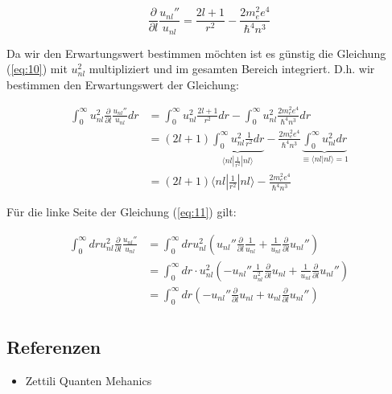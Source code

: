 \begin{equation}
  \label{eq:10}
  \frac{\partial}{\partial l}\frac{u_{nl}''}{u_{nl}} = \frac{2l+1}{r^2} - \frac{2 m_e^2e^4}{\hbar^4 n^3}
\end{equation}


Da wir den Erwartungswert bestimmen möchten ist es günstig die Gleichung (\ref{eq:10}) mit \(u_{nl}^2\) multipliziert und im gesamten Bereich integriert. D.h. wir bestimmen den Erwartungswert der Gleichung:

\begin{align}
  \label{eq:11}
  \int_0^{\infty} u_{nl}^2 \frac{\partial}{\partial l}\frac{u_{nl}''}{u_{nl}} dr &= \int_0^{\infty} u_{nl}^2 \frac{2l+1}{r^2} dr - \int_0^{\infty} u_{nl}^2\frac{2 m_e^2e^4}{\hbar^4 n^3}dr\\
&=(2l+1) \underbrace{ \int_0^{\infty} u_{nl}^2 \frac{1}{r^2}dr}_{\langle nl|\frac{1}{r^2}|nl\rangle  } -\frac{2 m_e^2e^4}{\hbar^4 n^3}\underbrace{ \int_0^{\infty} u_{nl}^2 dr}_{\equiv\langle nl|nl\rangle = 1 } \\
&=(2l+1)\langle nl|\frac{1}{r^2}|nl\rangle   -\frac{2 m_e^2e^4}{\hbar^4 n^3}
\end{align}

Für die linke Seite der Gleichung (\ref{eq:11}) gilt:

\begin{align}
  \label{eq:12}
   \int_0^{\infty}dr u_{nl}^2 \frac{\partial}{\partial l}\frac{u_{nl}''}{u_{nl}} &= \int_0^{\infty}dr u_{nl}^2\left(u_{nl}'' \frac{\partial}{\partial l}\frac{1}{u_{nl}}+ \frac{1}{u_{nl}} \frac{\partial}{\partial l}u_{nl}''  \right) \\
&= \int_0^{\infty}dr\cdot u_{nl}^2\left(- u_{nl}'' \frac{1}{u_{nl}^2}\frac{\partial}{\partial l} u_{nl}  + \frac{1}{u_{nl}} \frac{\partial}{\partial l}u_{nl}''  \right)\\
&= \int_0^{\infty}dr \left(- u_{nl}'' \frac{\partial}{\partial l} u_{nl}  + u_{nl} \frac{\partial}{\partial l}u_{nl}''  \right)\\
\end{align}



\subsection*{Referenzen}
\begin{itemize}
\item Zettili Quanten Mehanics
\end{itemize}



